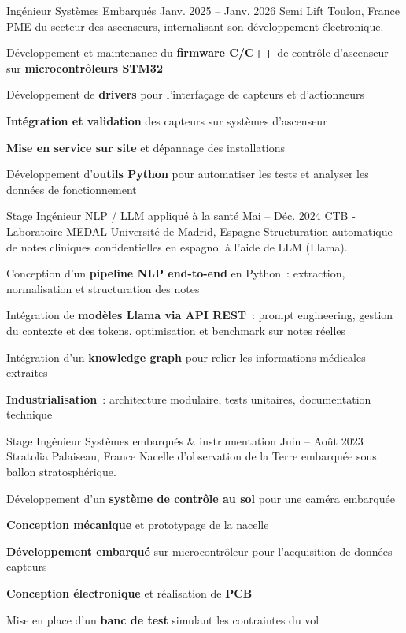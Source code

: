 \documentclass[10pt]{article}
\begin{document}
\begin{cvmain}
\begin{cvtimeline}
\cvsep
\cvexperience
  {Ingénieur Systèmes Embarqués}
  {Janv. 2025 -- Janv. 2026}
  {Semi Lift}
  {Toulon, France}
  {PME du secteur des ascenseurs, internalisant son développement électronique.}
\begin{cvitems}
  \item Développement et maintenance du \textbf{firmware C/C++} de contrôle d’ascenseur sur \textbf{microcontrôleurs STM32}
  \item Développement de \textbf{drivers} pour l’interfaçage de capteurs et d’actionneurs
  \item \textbf{Intégration et validation} des capteurs sur systèmes d’ascenseur
  \item \textbf{Mise en service sur site} et dépannage des installations
  \item Développement d’\textbf{outils Python} pour automatiser les tests et analyser les données de fonctionnement
\end{cvitems}

\cvsep
\cvexperience
  {Stage Ingénieur NLP / LLM appliqué à la santé}
  {Mai -- Déc. 2024}
  {CTB - Laboratoire MEDAL}
  {Université de Madrid, Espagne}
  {Structuration automatique de notes cliniques confidentielles en espagnol
   à l’aide de LLM (Llama).}
\begin{cvitems}
  \item Conception d’un \textbf{pipeline NLP end-to-end} en Python~: extraction, normalisation et structuration des notes
  \item Intégration de \textbf{modèles Llama via API REST}~: prompt engineering, gestion du contexte et des tokens, optimisation et benchmark sur notes réelles
  \item Intégration d’un \textbf{knowledge graph} pour relier les informations médicales extraites
  \item \textbf{Industrialisation}~: architecture modulaire, tests unitaires, documentation technique
\end{cvitems}

\cvsep
\cvexperience
  {Stage Ingénieur Systèmes embarqués \& instrumentation}
  {Juin -- Août 2023}
  {Stratolia}
  {Palaiseau, France}
  {Nacelle d’observation de la Terre embarquée sous ballon stratosphérique.}
\begin{cvitems}
  \item Développement d’un \textbf{système de contrôle au sol} pour une caméra embarquée
  \item \textbf{Conception mécanique} et prototypage de la nacelle
  \item \textbf{Développement embarqué} sur microcontrôleur pour l’acquisition de données capteurs
  \item \textbf{Conception électronique} et réalisation de \textbf{PCB}
  \item Mise en place d’un \textbf{banc de test} simulant les contraintes du vol
\end{cvitems}


\end{cvtimeline}
\end{cvmain}
\end{document}
